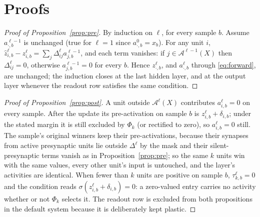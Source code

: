 \documentclass{article}
\begin{document}
\section{Proofs}
\label{app:proofs}
\begin{proof}[Proof of Proposition~\ref{prop:pre}]
By induction on $\ell$, for every sample $b$. Assume $a^{\ell-1}_{\cdot,b}$ is unchanged
(true for $\ell=1$ since $a^0_{\cdot,b}=x_b$). For any unit $i$,
$\widehat z^\ell_{i,b}-z^\ell_{i,b}=\sum_j\Delta^\ell_{ij}a^{\ell-1}_{j,b}$, and each term
vanishes: if $j\in\mathcal{A}^{\ell-1}(X)$ then $\Delta^\ell_{ij}=0$, otherwise
$a^{\ell-1}_{j,b}=0$ for every $b$. Hence $z^\ell_{\cdot,b}$, and $a^\ell_{\cdot,b}$ through
\eqref{eq:forward}, are unchanged; the induction closes at the last hidden layer, and at the
output layer whenever the readout row satisfies the same condition.
\end{proof}
\begin{proof}[Proof of Proposition~\ref{prop:post}]
A unit outside $\mathcal{A}^\ell(X)$ contributes $a^\ell_{i,b}=0$ on every sample. After the
update its pre-activation on sample $b$ is $z^\ell_{i,b}+\delta_{i,b}$; under the stated
margin it is still excluded by $\Phi_k$ (or rectified to zero), so $a^\ell_{i,b}=0$ still. The
sample's original winners keep their pre-activations, because their synapses from active
presynaptic units lie outside $\Delta^\ell$ by the mask and their silent-presynaptic terms
vanish as in Proposition~\ref{prop:pre}; so the same $k$ units win with the same values,
every other unit's input is untouched, and the layer's activities are identical. When fewer
than $k$ units are positive on sample $b$, $\tau^\ell_{k,b}=0$ and the condition reads
$\sigma(z^\ell_{i,b}+\delta_{i,b})=0$: a zero-valued entry carries no activity whether or not
$\Phi_k$ selects it. The readout row is excluded from both propositions in the
default system because it is deliberately kept plastic.
\end{proof}
\end{document}

